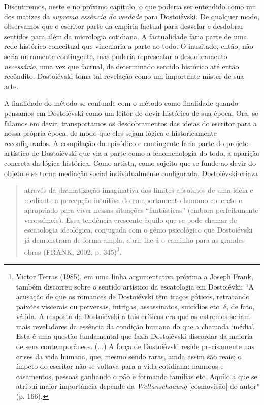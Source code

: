 Discutiremos, neste e no próximo capítulo, o que poderia ser entendido
como um dos matizes da \emph{suprema essência da verdade} para
Dostoiévski. De qualquer modo, observamos que o escritor parte da
empiria factual para desvelar e desdobrar sentidos para além da
micrologia cotidiana. A factualidade faria parte de uma rede
histórico-conceitual que vincularia a parte ao todo. O inusitado, então,
não seria meramente contingente, mas poderia representar o desdobramento
\emph{necessário}, uma vez que factual, de determinado sentido histórico
até então recôndito. Dostoiévski toma tal revelação como um importante
mister de sua arte.

A finalidade do método se confunde com o método como finalidade quando
pensamos em Dostoiévski como um leitor do devir histórico de sua época.
Ora, se falamos em devir, transportamos os desdobramentos das ideias do
escritor para a nossa própria época, de modo que eles sejam lógica e
historicamente reconfigurados. A compilação do episódico e contingente
faria parte do projeto artístico de Dostoiévski que via a parte como a
fenomenologia do todo, a aparição concreta da lógica histórica. Como
artista, como sujeito que se funde ao devir do objeto e se torna
mediação social individualmente configurada, Dostoiévski criava

\begin{quote}
através da dramatização imaginativa dos limites absolutos de uma ideia e
mediante a percepção intuitiva do comportamento humano concreto e
apropriado para viver nessas situações ``fantásticas'' (embora
perfeitamente verossímeis). Essa tendência crescente àquilo que se pode
chamar de escatologia ideológica, conjugada com o gênio psicológico que
Dostoiévski já demonstrara de forma ampla, abrir-lhe-á o caminho para as
grandes obras (FRANK, 2002, p. 345)\footnote{Victor Terras (1985), em
  uma linha argumentativa próxima a Joseph Frank, também discorreu sobre
  o sentido artístico da escatologia em Dostoiévki: ``A acusação de que
  os romances de Dostoiévski têm traços góticos, retratando paixões
  viscerais ou perversas, intrigas, assassinatos, suicídios etc. é, de
  fato, válida. A resposta de Dostoiévski a tais críticas era que os
  extremos seriam mais reveladores da essência da condição humana do que
  a chamada `média'. Esta é uma questão fundamental que fazia
  Dostoiévski discordar da maioria de seus contemporâneos. (...) A força
  de Dostoiévski reside precisamente nas crises da vida humana, que,
  mesmo sendo raras, ainda assim são reais; o ímpeto do escritor não se
  voltava para a vida cotidiana: namoros e casamentos, pessoas ganhando
  o pão e formando famílias etc. Aquilo a que se atribui maior
  importância depende da \emph{Weltanschaaung} {[}cosmovisão{]} do
  autor'' (p. 166).}.
\end{quote}

